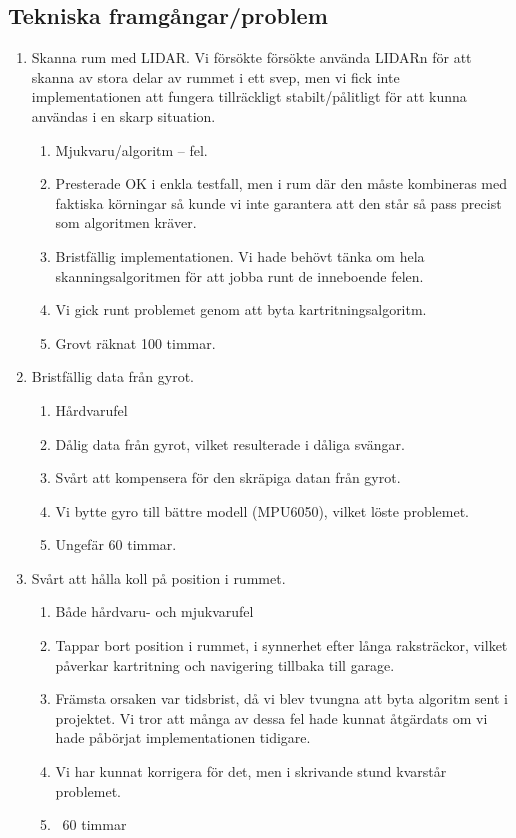 \documentclass[a4paper,11pt]{article}
\begin{document}
\clearpage
\subsection{Tekniska framgångar/problem}
\begin{enumerate}
\item Skanna rum med LIDAR. Vi försökte försökte använda LIDARn för att skanna av stora delar av rummet i ett svep, men vi fick inte implementationen att fungera tillräckligt stabilt/pålitligt för att kunna användas i en skarp situation.
\begin{enumerate}[label=\alph*]
\item Mjukvaru/algoritm – fel.
\item Presterade OK i enkla testfall, men i rum där den måste kombineras med faktiska körningar så kunde vi inte garantera att den står så pass precist som algoritmen kräver.
\item Bristfällig implementationen. Vi hade behövt tänka om hela skanningsalgoritmen för att jobba runt de inneboende felen.
\item Vi gick runt problemet genom att byta kartritningsalgoritm.
\item Grovt räknat 100 timmar. 
\end{enumerate}

\item Bristfällig data från gyrot.
\begin{enumerate}[label=\alph*]
\item Hårdvarufel
\item Dålig data från gyrot, vilket resulterade i dåliga svängar.
\item Svårt att kompensera för den skräpiga datan från gyrot.
\item Vi bytte gyro till bättre modell (MPU6050), vilket löste problemet.
\item Ungefär 60 timmar.
\end{enumerate}

\item Svårt att hålla koll på position i rummet.
\begin{enumerate}[label=\alph*]
\item Både hårdvaru- och mjukvarufel
\item Tappar bort position i rummet, i synnerhet efter långa raksträckor, vilket påverkar kartritning och navigering tillbaka till garage.
\item Främsta orsaken var tidsbrist, då vi blev tvungna att byta algoritm sent i projektet. Vi tror att många av dessa fel hade kunnat åtgärdats om vi hade påbörjat implementationen tidigare.
\item Vi har kunnat korrigera för det, men i skrivande stund kvarstår problemet.
\item ~60 timmar
\end{enumerate}

\end{enumerate}
\end{document}
